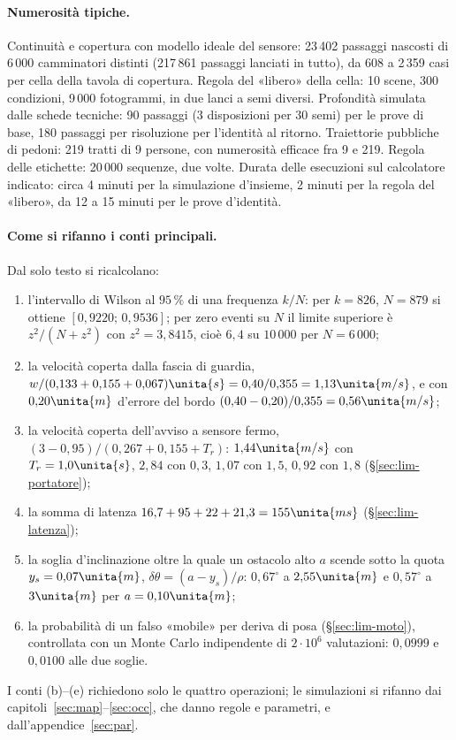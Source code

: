 \paragraph{Numerosità tipiche.} Continuità e copertura con modello ideale del sensore: 23\,402 passaggi nascosti di 6\,000 camminatori distinti (217\,861 passaggi lanciati in tutto), da 608 a 2\,359 casi per cella della tavola di copertura. Regola del «libero» della cella: 10 scene, 300 condizioni, 9\,000 fotogrammi, in due lanci a semi diversi. Profondità simulata dalle schede tecniche: 90 passaggi (3 disposizioni per 30 semi) per le prove di base, 180 passaggi per risoluzione per l'identità al ritorno. Traiettorie pubbliche di pedoni: 219 tratti di 9 persone, con numerosità efficace fra 9 e 219. Regola delle etichette: 20\,000 sequenze, due volte. Durata delle esecuzioni sul calcolatore indicato: circa 4 minuti per la simulazione d'insieme, 2 minuti per la regola del «libero», da 12 a 15 minuti per le prove d'identità.

\paragraph{Come si rifanno i conti principali.} Dal solo testo si ricalcolano:
\begin{enumerate}[label=(\alph*)]
\item l'intervallo di Wilson al $95\,\%$ \cite{wilson1927,brown2001} di una frequenza $k/N$: per $k=826$, $N=879$ si ottiene $[0{,}9220;\,0{,}9536]$; per zero eventi su $N$ il limite superiore è $z^2/(N+z^2)$ con $z^2=3{,}8415$, cioè $6{,}4$ su $10\,000$ per $N=6\,000$;
\item la velocità coperta dalla fascia di guardia, $w/(0{,}133+0{,}155+0{,}067)\unita{s}=0{,}40/0{,}355=1{,}13\unita{m/s}$, e con $0{,}20\unita{m}$ d'errore del bordo $(0{,}40-0{,}20)/0{,}355=0{,}56\unita{m/s}$;
\item la velocità coperta dell'avviso a sensore fermo, $(3-0{,}95)/(0{,}267+0{,}155+T_r)$: $1{,}44\unita{m/s}$ con $T_r=1{,}0\unita{s}$, $2{,}84$ con $0{,}3$, $1{,}07$ con $1{,}5$, $0{,}92$ con $1{,}8$ (\S\ref{sec:lim-portatore});
\item la somma di latenza $16{,}7+95+22+21{,}3=155\unita{ms}$ (\S\ref{sec:lim-latenza});
\item la soglia d'inclinazione oltre la quale un ostacolo alto $a$ scende sotto la quota $y_s=0{,}07\unita{m}$, $\delta\theta=(a-y_s)/\rho$: $0{,}67^\circ$ a $2{,}55\unita{m}$ e $0{,}57^\circ$ a $3\unita{m}$ per $a=0{,}10\unita{m}$;
\item la probabilità di un falso «mobile» per deriva di posa (\S\ref{sec:lim-moto}), controllata con un Monte Carlo indipendente di $2\cdot10^6$ valutazioni: $0{,}0999$ e $0{,}0100$ alle due soglie.
\end{enumerate}
I conti (b)--(e) richiedono solo le quattro operazioni; le simulazioni si rifanno dai capitoli~\ref{sec:map}--\ref{sec:occ}, che danno regole e parametri, e dall'appendice~\ref{sec:par}.
